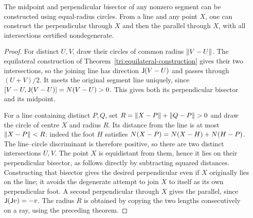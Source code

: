 \begin{theorem}
\label{circ:perpendicular-construction}
The midpoint and perpendicular bisector of any nonzero segment can be
constructed using equal-radius circles.  From a line and any point $X$,
one can construct the perpendicular through $X$ and then the parallel
through $X$, with all intersections certified nondegenerate.
\end{theorem}
\begin{proof}
For distinct $U,V$, draw their circles of common radius $\lVert V-U\rVert$.
The equilateral construction of Theorem~\ref{tri:equilateral-construction}
gives their two intersections, so the joining line has direction
$\mathsf J(V-U)$ and passes through $(U+V)/2$.  It meets the original segment
line uniquely, since
$[V-U,\mathsf J(V-U)]=N(V-U)>0$.
This gives both its perpendicular bisector and its midpoint.

For a line containing distinct $P,Q$, set
$R=\lVert X-P\rVert+\lVert Q-P\rVert>0$ and draw the circle of centre $X$ and radius
$R$.  Its distance from the line is at most $\lVert X-P\rVert<R$:
indeed the foot $H$ satisfies
$N(X-P)=N(X-H)+N(H-P)$.
The line--circle discriminant is therefore positive, so there are two
distinct intersections $U,V$.  The point $X$ is equidistant from them,
hence it lies on their perpendicular bisector, as follows directly by
subtracting squared distances.  Constructing that bisector gives the
desired perpendicular even if $X$ originally lies on the line; it avoids
the degenerate attempt to join $X$ to itself as its own perpendicular
foot.  A second perpendicular through $X$ gives the parallel, since
$\mathsf J(\mathsf J v)=-v$.
The radius $R$ is obtained by copying the two lengths consecutively on a
ray, using the preceding theorem.
\end{proof}

